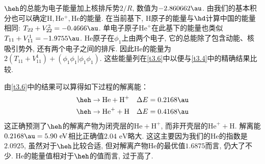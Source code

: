 $\heh$的总能为电子能量加上核排斥势$2/R$, 数值为$-2.860662\au$. 
由我们的基本积分也可以确定$\mathrm{H,He^+,He}$的能量. 
在当前基下, $\mathrm{H}$原子的能量与$\hd$计算中国的能量相同: $T_{22}+V_{22}^2=-0.4666\au$. 
单电子原子$\mathrm{He}^+$在此基下的能量也类似$T_{11}+V_{11}^1=-1.9755\au$. 
$\mathrm{He}$原子在$\phi_1$上由两个电子, 它的总能除了包含动能、核吸引势外, 还有两个电子之间的排斥. 
因此$\mathrm{He}$的能量为$2(T_{11}+V_{11}^1)+(\phi_1\phi_1|\phi_1\phi_1)$. 
这些能量列在\autoref{t3.6}中以便与\autoref{t3.4}中的精确结果比较.

由\autoref{t3.6}中的结果可以算得如下过程的解离能：
\begin{align}
	\heh & \to \text{He} + \text{H}^+ \quad \Delta E = 0.2168\au\\
	\heh & \to \text{He}^+ + \text{H} \quad \Delta E = 0.4168\au
\end{align}
这正确预测了$\heh$的解离产物为闭壳层的$\text{He}+\text{H}^+$, 
而非开壳层的$\text{He}^++\text{H}$. 
解离能$0.2168\au=5.90\,\,\text{eV}$相比正确值$2.04\,\,\text{eV}$略大.
这这主要因为我们的$\text{He}$的指数是$2.0925$, 
虽然对于$\heh$比较合适,  
但对解离产物$\text{He}$的最优值$1.6875$而言, 
仍大了不少. 
$\text{He}$的能量值相对于$\heh$的值而言, 
过于高了.

